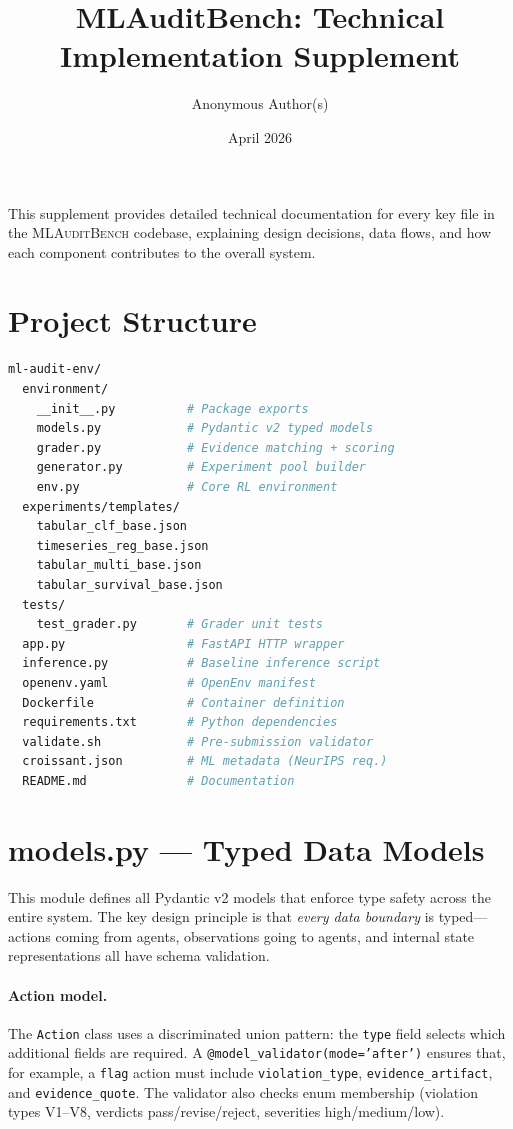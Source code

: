 \documentclass{article}
\title{\textbf{MLAuditBench}: Technical Implementation Supplement}
\author{Anonymous Author(s)}
\date{April 2026}
\begin{document}
\maketitle

This supplement provides detailed technical documentation for every key
file in the \textsc{MLAuditBench} codebase, explaining design decisions,
data flows, and how each component contributes to the overall system.

\section{Project Structure}

\begin{lstlisting}[language=bash]
ml-audit-env/
  environment/
    __init__.py          # Package exports
    models.py            # Pydantic v2 typed models
    grader.py            # Evidence matching + scoring
    generator.py         # Experiment pool builder
    env.py               # Core RL environment
  experiments/templates/
    tabular_clf_base.json
    timeseries_reg_base.json
    tabular_multi_base.json
    tabular_survival_base.json
  tests/
    test_grader.py       # Grader unit tests
  app.py                 # FastAPI HTTP wrapper
  inference.py           # Baseline inference script
  openenv.yaml           # OpenEnv manifest
  Dockerfile             # Container definition
  requirements.txt       # Python dependencies
  validate.sh            # Pre-submission validator
  croissant.json         # ML metadata (NeurIPS req.)
  README.md              # Documentation
\end{lstlisting}

\section{models.py --- Typed Data Models}

This module defines all Pydantic v2 models that enforce type safety across
the entire system.  The key design principle is that \emph{every data
boundary} is typed---actions coming from agents, observations going to
agents, and internal state representations all have schema validation.

\paragraph{Action model.}
The \texttt{Action} class uses a discriminated union pattern: the
\texttt{type} field selects which additional fields are required.  A
\texttt{@model\_validator(mode='after')} ensures that, for example, a
\texttt{flag} action must include \texttt{violation\_type},
\texttt{evidence\_artifact}, and \texttt{evidence\_quote}.  The validator
also checks enum membership (violation types V1--V8, verdicts
pass/revise/reject, severities high/medium/low).
\end{document}

